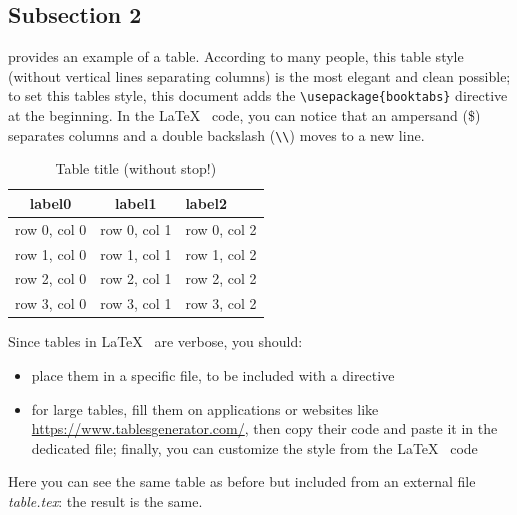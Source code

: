 \documentclass[12pt,oneside,a4paper]{article}
\begin{document}
\subsection{Subsection 2} \label{sec:sub2}
 provides an example of a table. According to many people, this table style (without vertical lines separating columns) is the most elegant and clean possible; to set this tables style, this document adds the \verb|\usepackage{booktabs}| directive at the beginning. In the \LaTeX~ code, you can notice that an ampersand (\$) separates columns and a double backslash (\verb|\\|) moves to a new line.
\begin{table}
	\caption{Table title (without stop!)}
	\centering
	\begin{tabular}{ccl}
		\toprule
		\textbf{label0} & \textbf{label1} & \textbf{label2} \\
		\midrule
		row 0, col 0 & row 0, col 1 & row 0, col 2 \\
		row 1, col 0 & row 1, col 1 & row 1, col 2 \\ 
		row 2, col 0 & row 2, col 1 & row 2, col 2 \\ 
		row 3, col 0 & row 3, col 1 & row 3, col 2 \\
		\bottomrule
	\end{tabular}
	\label{tab:example}
\end{table}

Since tables in \LaTeX~ are verbose, you should:
\begin{itemize}
\item place them in a specific file, to be included with a \verb|| directive
\item for large tables, fill them on applications or websites like \url{https://www.tablesgenerator.com/}, then copy their code and paste it in the dedicated file; finally, you can customize the style from the \LaTeX~ code
\end{itemize}

Here you can see the same table as before but included from an external file \textit{table.tex}: the result is the same.
%


\printbibliography
\end{document}
